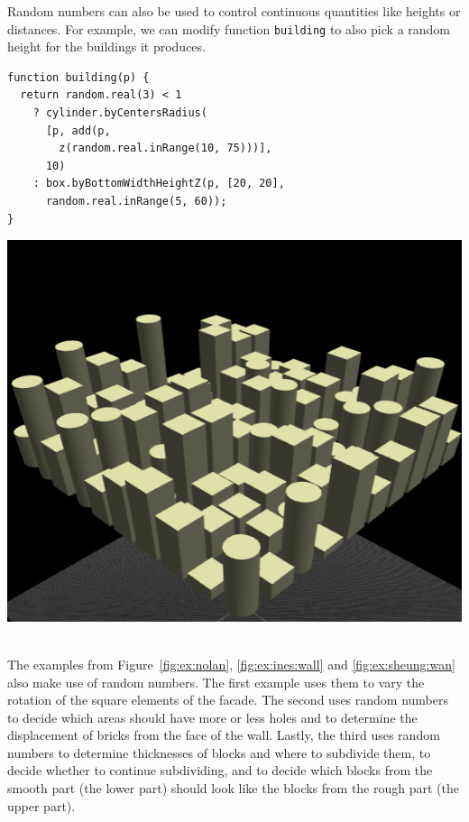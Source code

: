 
Random numbers can also be used to control continuous quantities like heights or distances.
For example, we can modify function {\tt building} to also pick a random height for the buildings it produces.

\noindent
\begin{minipage}{1.0\textwidth}
\begin{minipage}{0.5\linewidth}
\begin{verbatim}
function building(p) {
  return random.real(3) < 1
    ? cylinder.byCentersRadius(
      [p, add(p,
        z(random.real.inRange(10, 75)))],
      10)
    : box.byBottomWidthHeightZ(p, [20, 20],
      random.real.inRange(5, 60));
}
\end{verbatim}
\end{minipage}%
\begin{minipage}{0.5\linewidth}
  \includegraphics[width=1.0\linewidth]{./images/detail_examples/box_cyl_city_random_crop}
\end{minipage}
\end{minipage}
\\

The examples from Figure~\ref{fig:ex:nolan}, \ref{fig:ex:ines:wall} and \ref{fig:ex:sheung:wan} also make use of random numbers.
The first example uses them to vary the rotation of the square elements of the facade.
The second uses random numbers to decide which areas should have more or less holes and to determine the displacement of bricks from the face of the wall.
Lastly, the third uses random numbers to determine thicknesses of blocks and where to subdivide them, to decide whether to continue subdividing, and to decide which blocks from the smooth part (the lower part) should look like the blocks from the rough part (the upper part).

